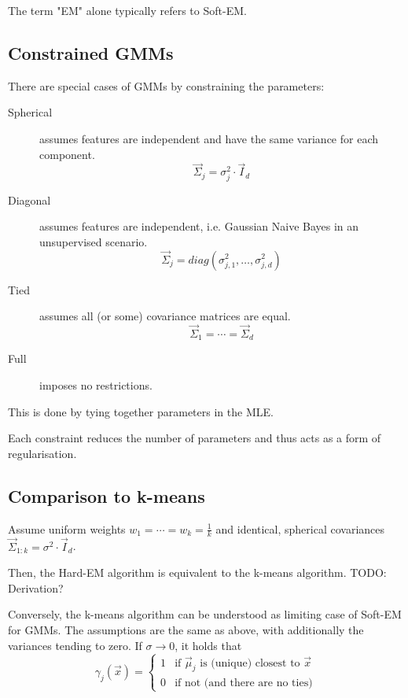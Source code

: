 The term "EM" alone typically refers to Soft-EM.


\subsection{Constrained GMMs}
There are special cases of GMMs by constraining the parameters:
\begin{description}
	\item[Spherical] assumes features are independent and
	have the same variance for each component.
	\begin{equation*}
	\vec{\Sigma}_j = \sigma^2_j \cdot \vec{I}_d
	\end{equation*}
	
	\item[Diagonal] assumes features are independent,
	i.e. Gaussian Naive Bayes in an unsupervised scenario.
	\begin{equation*}
	\vec{\Sigma}_j = diag(\sigma_{j,1}^2, \dotsc, \sigma_{j,d}^2)
	\end{equation*}
	
	\item[Tied] assumes all (or some) 
	covariance matrices are equal.
	\begin{equation*}
	\vec{\Sigma}_1 = \dotsb = \vec{\Sigma}_d
	\end{equation*}
	
	\item[Full] imposes no restrictions.
\end{description}

This is done by tying together parameters in the MLE.

Each constraint reduces the number of parameters and thus
acts as a form of regularisation.


\subsection{Comparison to k-means}
Assume uniform weights $w_1 = \dotsb = w_k = \frac{1}{k}$
and identical, spherical covariances
$\vec{\Sigma}_{1:k} = \sigma^2 \cdot \vec{I}_d$.

Then, the Hard-EM algorithm is equivalent to the
k-means algorithm.
TODO: Derivation?

Conversely, the k-means algorithm can be understood
as limiting case of Soft-EM for GMMs.
The assumptions are the same as above,
with additionally the variances tending to zero.
If $\sigma \to 0$, it holds that
\begin{equation*}
\gamma_j(\vec{x}) =
\begin{cases}
1 & \text{if $\vec{\mu}_j$ is (unique) closest to $\vec{x}$} \\
0 & \text{if not (and there are no ties)}
\end{cases}
\end{equation*}

